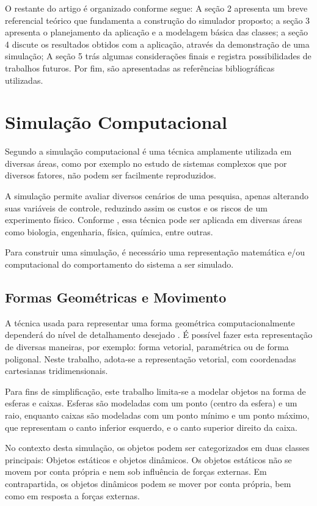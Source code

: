 \documentclass[12pt]{article}
\begin{document}
O restante do artigo é organizado conforme segue: A seção 2 apresenta um breve referencial teórico que fundamenta a construção do simulador proposto; a seção 3 apresenta o planejamento da aplicação e a modelagem básica das classes; a seção 4 discute os resultados obtidos com a aplicação, através da demonstração de uma simulação; A seção 5 trás algumas considerações finais e registra possibilidades de trabalhos futuros. Por fim, são apresentadas as referências bibliográficas utilizadas.

\section{Simulação Computacional}

Segundo \cite{duran2018computer} a simulação computacional é uma técnica amplamente utilizada em diversas áreas, como por exemplo no estudo de sistemas complexos que por diversos fatores, não podem ser facilmente reproduzidos.

A simulação permite avaliar diversos cenários de uma pesquisa, apenas alterando suas variáveis de controle, reduzindo assim os custos e os riscos de um experimento físico. Conforme \cite{marschner2018}, essa técnica pode ser aplicada em diversas áreas como biologia, engenharia, física, química, entre outras.

Para construir uma simulação, é necessário uma representação matemática e/ou computacional do comportamento do sistema a ser simulado.

\subsection{Formas Geométricas e Movimento}
A técnica usada para representar uma forma geométrica computacionalmente dependerá do nível de detalhamento desejado \cite{pharr2016}. É possível fazer esta representação de diversas maneiras, por exemplo: forma vetorial, paramétrica ou de forma poligonal. Neste trabalho, adota-se a representação vetorial, com coordenadas cartesianas tridimensionais.

Para fins de simplificação, este trabalho limita-se a modelar objetos na forma de esferas e caixas. Esferas são modeladas com um ponto (centro da esfera) e um raio, enquanto caixas são modeladas com um ponto mínimo e um ponto máximo, que representam o canto inferior esquerdo, e o canto superior direito da caixa.

No contexto desta simulação, os objetos podem ser categorizados em duas classes principais: Objetos estáticos e objetos dinâmicos. Os objetos estáticos não se movem por conta própria e nem sob influência de forças externas. Em contrapartida, os objetos dinâmicos podem se mover por conta própria, bem como em resposta a forças externas.
\end{document}
